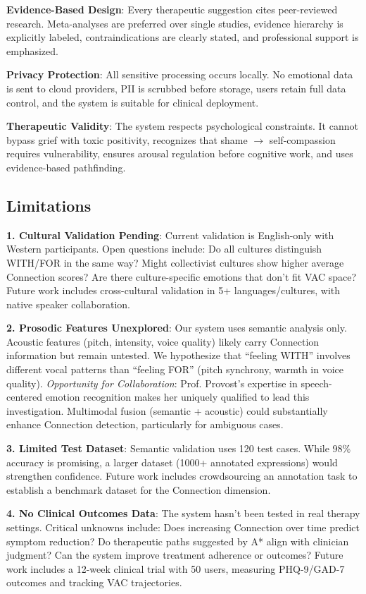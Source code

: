 \documentclass[10pt,twocolumn]{article}
\begin{document}
\textbf{Evidence-Based Design}: Every therapeutic suggestion cites peer-reviewed research. Meta-analyses are preferred over single studies, evidence hierarchy is explicitly labeled, contraindications are clearly stated, and professional support is emphasized.

\textbf{Privacy Protection}: All sensitive processing occurs locally. No emotional data is sent to cloud providers, PII is scrubbed before storage, users retain full data control, and the system is suitable for clinical deployment.

\textbf{Therapeutic Validity}: The system respects psychological constraints. It cannot bypass grief with toxic positivity, recognizes that shame $\rightarrow$ self-compassion requires vulnerability, ensures arousal regulation before cognitive work, and uses evidence-based pathfinding.

\subsection{Limitations}

\textbf{1. Cultural Validation Pending}: Current validation is English-only with Western participants. Open questions include: Do all cultures distinguish WITH/FOR in the same way? Might collectivist cultures show higher average Connection scores? Are there culture-specific emotions that don't fit VAC space? Future work includes cross-cultural validation in 5+ languages/cultures, with native speaker collaboration.

\textbf{2. Prosodic Features Unexplored}: Our system uses semantic analysis only. Acoustic features (pitch, intensity, voice quality) likely carry Connection information but remain untested. We hypothesize that ``feeling WITH'' involves different vocal patterns than ``feeling FOR'' (pitch synchrony, warmth in voice quality). \textit{Opportunity for Collaboration}: Prof. Provost's expertise in speech-centered emotion recognition makes her uniquely qualified to lead this investigation. Multimodal fusion (semantic + acoustic) could substantially enhance Connection detection, particularly for ambiguous cases.

\textbf{3. Limited Test Dataset}: Semantic validation uses 120 test cases. While 98\% accuracy is promising, a larger dataset (1000+ annotated expressions) would strengthen confidence. Future work includes crowdsourcing an annotation task to establish a benchmark dataset for the Connection dimension.

\textbf{4. No Clinical Outcomes Data}: The system hasn't been tested in real therapy settings. Critical unknowns include: Does increasing Connection over time predict symptom reduction? Do therapeutic paths suggested by A* align with clinician judgment? Can the system improve treatment adherence or outcomes? Future work includes a 12-week clinical trial with 50 users, measuring PHQ-9/GAD-7 outcomes and tracking VAC trajectories.
\end{document}

